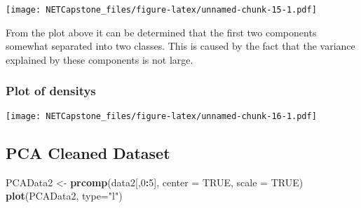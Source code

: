 \documentclass[
]{article}
\newenvironment{Shaded}{\begin{snugshade}}{\end{snugshade}}
\newcommand{\DataTypeTok}[1]{\textcolor[rgb]{0.13,0.29,0.53}{#1}}
\newcommand{\DecValTok}[1]{\textcolor[rgb]{0.00,0.00,0.81}{#1}}
\newcommand{\FloatTok}[1]{\textcolor[rgb]{0.00,0.00,0.81}{#1}}
\newcommand{\KeywordTok}[1]{\textcolor[rgb]{0.13,0.29,0.53}{\textbf{#1}}}
\newcommand{\NormalTok}[1]{#1}
\newcommand{\OperatorTok}[1]{\textcolor[rgb]{0.81,0.36,0.00}{\textbf{#1}}}
\newcommand{\OtherTok}[1]{\textcolor[rgb]{0.56,0.35,0.01}{#1}}
\newcommand{\StringTok}[1]{\textcolor[rgb]{0.31,0.60,0.02}{#1}}
\begin{document}
\texttt{[image: NETCapstone\_files/figure-latex/unnamed-chunk-15-1.pdf]}

From the plot above it can be determined that the first two components
somewhat separated into two classes. This is caused by the fact that the
variance explained by these components is not large.

\hypertarget{plot-of-densitys}{%
\subsubsection{Plot of densitys}\label{plot-of-densitys}}

\begin{Shaded}
\end{Shaded}

\texttt{[image: NETCapstone\_files/figure-latex/unnamed-chunk-16-1.pdf]}

\hypertarget{pca-cleaned-dataset}{%
\subsection{PCA Cleaned Dataset}\label{pca-cleaned-dataset}}

\begin{Shaded}
\begin{Highlighting}[]
\NormalTok{PCAData2 <-}\StringTok{ }\KeywordTok{prcomp}\NormalTok{(data2[,}\DecValTok{0}\OperatorTok{:}\DecValTok{5}\NormalTok{], }\DataTypeTok{center =} \OtherTok{TRUE}\NormalTok{, }\DataTypeTok{scale =} \OtherTok{TRUE}\NormalTok{)}
\KeywordTok{plot}\NormalTok{(PCAData2, }\DataTypeTok{type=}\StringTok{"l"}\NormalTok{)}
\end{Highlighting}
\end{Shaded}
\end{document}
